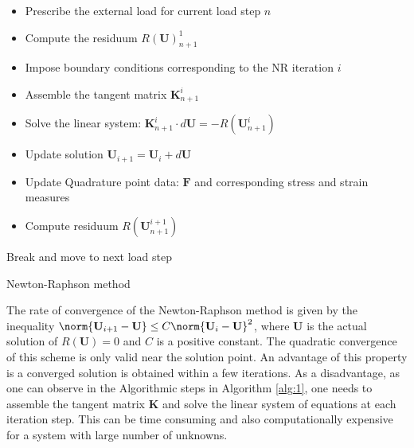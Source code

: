 \documentclass[11pt,a4paper,final]{article}
\begin{document}
\begin{algorithm}[H]
\BlankLine
{}
{
	\begin{itemize}
	\item Prescribe the external load for current load step $n$\;
	\item Compute the residuum $R(\mathbf{U})^1_{n+1}$\;
	\end{itemize}

	{
		{
		\begin{itemize}
		\item Impose boundary conditions corresponding to the NR iteration $i$\;
		\item Assemble the tangent matrix $\mathbf{K}^{i}_{n+1}$\;
		\item Solve the linear system: $\mathbf{K}^{i}_{n+1} \cdot d\mathbf{U} = -R(\mathbf{U}^i_{n+1})$\;
		\item Update solution $\mathbf{U}_{i+1} = \mathbf{U}_i + d\mathbf{U}$\;
		\item Update Quadrature point data: $\mathbf{F}$ and corresponding stress and strain measures\;
		\item Compute residuum $R(\mathbf{U}^{i+1}_{n+1})$\;
		\end{itemize}
		}
		{Break and move to next load step\;}			
	}
}
\caption{Newton-Raphson method}
\label{alg:1}
\end{algorithm} \par 

The rate of convergence of the Newton-Raphson method is given by the inequality $\norm{\mathbf{U}_{i+1} - \mathbf{U}} \leq C \norm{\mathbf{U}_i - \mathbf{U}}^2$, where $\mathbf{U}$ is the actual solution of $R(\mathbf{U}) = 0$ and $C$ is a positive constant. The quadratic convergence of this scheme is only valid near the solution point. An advantage of this property is a converged solution is obtained within a few iterations. As a disadvantage, as one can observe in the Algorithmic steps in Algorithm \eqref{alg:1}, one needs to assemble the tangent matrix $\mathbf{K}$ and solve the linear system of equations at each iteration step. This can be time consuming and also computationally expensive for a system with large number of unknowns. \par 
\end{document}
